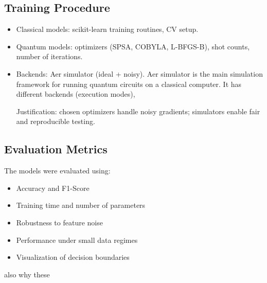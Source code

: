 \subsection{Training Procedure}


\begin{itemize}
    \item Classical models: scikit-learn training routines, CV setup.
    \item Quantum models: optimizers (SPSA, COBYLA, L-BFGS-B), shot counts, number of iterations.


    \item Backends: Aer simulator (ideal + noisy).
Aer simulator is the main simulation framework for running quantum circuits on a classical computer. It has different backends (execution modes),

Justification: chosen optimizers handle noisy gradients; simulators enable fair and reproducible testing.

\end{itemize}



\subsection{Evaluation Metrics}
The models were evaluated using:
\begin{itemize}
    \item Accuracy and F1-Score
    \item Training time and number of parameters
    \item Robustness to feature noise
    \item Performance under small data regimes
    \item Visualization of decision boundaries 
\end{itemize}

also why these

